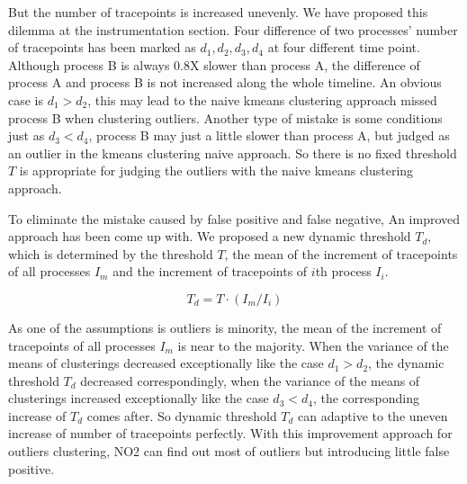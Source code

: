 But the number of tracepoints is increased unevenly. We have proposed this dilemma at the instrumentation section. Four difference of two processes' number of tracepoints has been marked as $d_1, d_2, d_3, d_4$ at four different time point. Although process B is always 0.8X slower than process A, the difference of process A and process B is not increased along the whole timeline. An obvious case is $d_1 > d_2$, this may lead to the naive kmeans clustering approach missed process B when clustering outliers. Another type of mistake is some conditions just as $d_3 < d_4$, process B may just a little slower than process A, but judged as an outlier in the kmeans clustering naive approach. So there is no fixed threshold $T$ is appropriate for judging the outliers with the naive kmeans clustering approach.

To eliminate the mistake caused by false positive and false negative, An improved approach has been come up with. We proposed a new dynamic threshold $T_d$, which is determined by the threshold $T$, the mean of the increment of tracepoints of all processes $I_m$ and the increment of tracepoints of $i$th process $I_i$.

$$T_d = T \cdot (I_m / I_i)$$

As one of the assumptions is outliers is minority, the mean of the increment of tracepoints of all processes $I_m$ is near to the majority. When the variance of the means of clusterings decreased exceptionally like the case $d_1 > d_2$, the dynamic threshold $T_d$ decreased correspondingly, when the variance of the means of clusterings increased exceptionally like the case $d_3 < d_4$, the corresponding increase of $T_d$ comes after. So dynamic threshold $T_d$ can adaptive to the uneven increase of number of tracepoints perfectly. With this improvement approach for outliers clustering, NO2 can find out most of outliers but introducing little false positive. 
